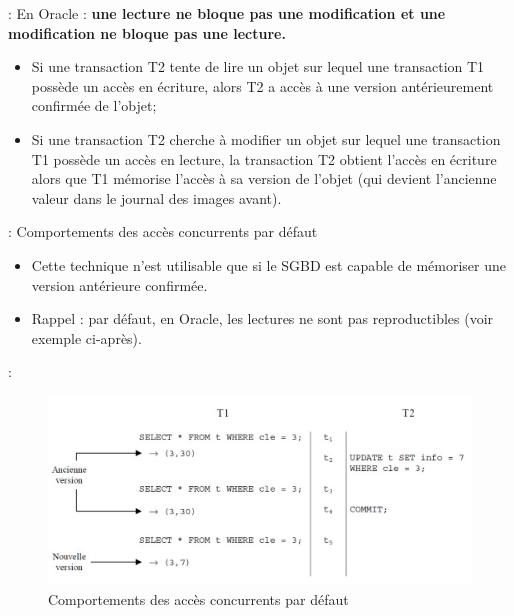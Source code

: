 \documentclass[10pt]{beamer}
\begin{document}
\begin{frame}{\secname : \subsecname}
    En Oracle : \textbf{une lecture ne bloque pas une modification et une modification ne bloque pas une lecture.}
    \begin{itemize}
        \item Si une transaction T2 tente de lire un objet sur lequel une transaction T1 possède un accès en écriture, alors T2 a accès à une version antérieurement confirmée de l'objet;
        \item Si une transaction T2 cherche à modifier un objet sur lequel une transaction T1 possède un accès en lecture, la transaction T2 obtient l'accès en écriture alors que T1 mémorise l'accès à sa version de l'objet (qui devient l'ancienne valeur dans le journal des images avant).
    \end{itemize}
\end{frame}

\begin{frame}{\secname : \subsecname}
    Comportements des accès concurrents par défaut
    \begin{itemize}
        \item Cette technique n'est utilisable que si le SGBD est capable de mémoriser une version antérieure confirmée.
        \item Rappel : par défaut, en Oracle, les lectures ne sont pas reproductibles (voir exemple ci-après).
    \end{itemize}
\end{frame}

\begin{frame}{\secname : \subsecname}
    \begin{figure}
        \begin{center}
            \includegraphics[width=\textwidth]{../assets/img/coherence-de-lecture-2.pdf}
            \caption{Comportements des accès concurrents par défaut}
        \end{center}
    \end{figure}
\end{frame}
\end{document}
